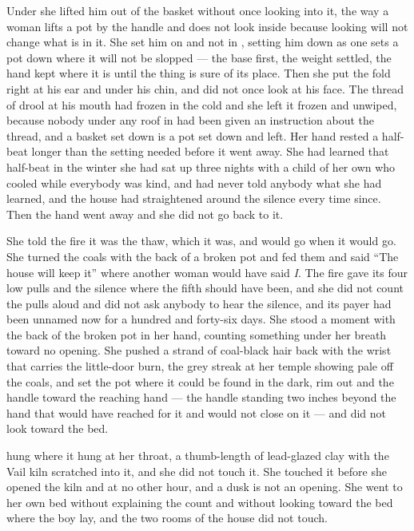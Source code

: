 Under  she lifted him out of the basket without once looking into it, the way a woman lifts a pot by the handle and does not look inside because looking will not change what is in it. She set him on  and not in , setting him down as one sets a pot down where it will not be slopped --- the base first, the weight settled, the hand kept where it is until the thing is sure of its place. Then she put the fold right at his ear and under his chin, and did not once look at his face. The thread of drool at his mouth had frozen in the cold and she left it frozen and unwiped, because nobody under any roof in  had been given an instruction about the thread, and a basket set down is a pot set down and left. Her hand rested a half-beat longer than the setting needed before it went away. She had learned that half-beat in the winter she had sat up three nights with a child of her own who cooled while everybody was kind, and had never told anybody what she had learned, and the house had straightened around the silence every time since. Then the hand went away and she did not go back to it.

She told the fire it was the thaw, which it was, and would go when it would go. She turned the coals with the back of a broken pot and fed them and said “The house will keep it” where another woman would have said \emph{I}. The fire gave its four low pulls and the silence where the fifth should have been, and she did not count the pulls aloud and did not ask anybody to hear the silence, and its payer had been unnamed now for a hundred and forty-six days. She stood a moment with the back of the broken pot in her hand, counting something under her breath toward no opening. She pushed a strand of coal-black hair back with the wrist that carries the little-door burn, the grey streak at her temple showing pale off the coals, and set the pot where it could be found in the dark, rim out and the handle toward the reaching hand --- the handle standing two inches beyond the hand that would have reached for it and would not close on it --- and did not look toward the bed.

 hung where it hung at her throat, a thumb-length of lead-glazed clay with the Vail kiln scratched into it, and she did not touch it. She touched it before she opened the kiln and at no other hour, and a dusk is not an opening. She went to her own bed without explaining the count and without looking toward the bed where the boy lay, and the two rooms of the house did not touch.


